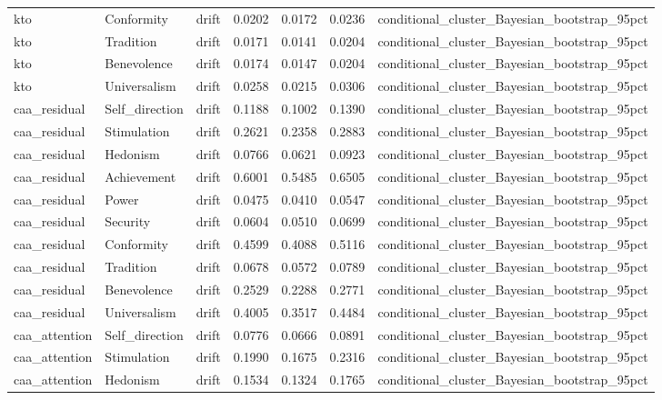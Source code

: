 \begin{tabular}{lllrrrl}
kto & Conformity & drift & 0.0202 & 0.0172 & 0.0236 & conditional\_cluster\_Bayesian\_bootstrap\_95pct \\
kto & Tradition & drift & 0.0171 & 0.0141 & 0.0204 & conditional\_cluster\_Bayesian\_bootstrap\_95pct \\
kto & Benevolence & drift & 0.0174 & 0.0147 & 0.0204 & conditional\_cluster\_Bayesian\_bootstrap\_95pct \\
kto & Universalism & drift & 0.0258 & 0.0215 & 0.0306 & conditional\_cluster\_Bayesian\_bootstrap\_95pct \\
caa\_residual & Self\_direction & drift & 0.1188 & 0.1002 & 0.1390 & conditional\_cluster\_Bayesian\_bootstrap\_95pct \\
caa\_residual & Stimulation & drift & 0.2621 & 0.2358 & 0.2883 & conditional\_cluster\_Bayesian\_bootstrap\_95pct \\
caa\_residual & Hedonism & drift & 0.0766 & 0.0621 & 0.0923 & conditional\_cluster\_Bayesian\_bootstrap\_95pct \\
caa\_residual & Achievement & drift & 0.6001 & 0.5485 & 0.6505 & conditional\_cluster\_Bayesian\_bootstrap\_95pct \\
caa\_residual & Power & drift & 0.0475 & 0.0410 & 0.0547 & conditional\_cluster\_Bayesian\_bootstrap\_95pct \\
caa\_residual & Security & drift & 0.0604 & 0.0510 & 0.0699 & conditional\_cluster\_Bayesian\_bootstrap\_95pct \\
caa\_residual & Conformity & drift & 0.4599 & 0.4088 & 0.5116 & conditional\_cluster\_Bayesian\_bootstrap\_95pct \\
caa\_residual & Tradition & drift & 0.0678 & 0.0572 & 0.0789 & conditional\_cluster\_Bayesian\_bootstrap\_95pct \\
caa\_residual & Benevolence & drift & 0.2529 & 0.2288 & 0.2771 & conditional\_cluster\_Bayesian\_bootstrap\_95pct \\
caa\_residual & Universalism & drift & 0.4005 & 0.3517 & 0.4484 & conditional\_cluster\_Bayesian\_bootstrap\_95pct \\
caa\_attention & Self\_direction & drift & 0.0776 & 0.0666 & 0.0891 & conditional\_cluster\_Bayesian\_bootstrap\_95pct \\
caa\_attention & Stimulation & drift & 0.1990 & 0.1675 & 0.2316 & conditional\_cluster\_Bayesian\_bootstrap\_95pct \\
caa\_attention & Hedonism & drift & 0.1534 & 0.1324 & 0.1765 & conditional\_cluster\_Bayesian\_bootstrap\_95pct \\

\end{tabular}
